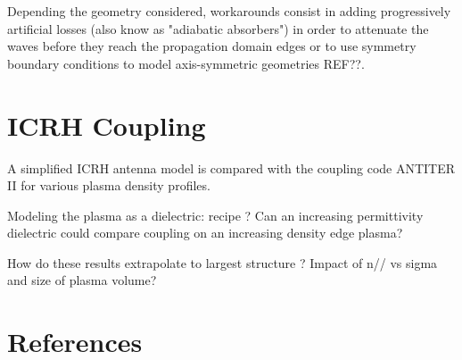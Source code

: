 \documentclass[preprint,3p,twocolumn]{elsarticle}
\begin{document}
Depending the geometry considered, workarounds consist in adding progressively artificial losses (also know as "adiabatic absorbers") in order to attenuate the waves before they reach the propagation domain edges\cite{Oskooi2008} or to use symmetry boundary conditions to model axis-symmetric geometries REF??.   



\section{ICRH Coupling}
A simplified ICRH antenna model is compared with the coupling code ANTITER II  \cite{Messiaen2011} for various plasma density profiles. 



Modeling the plasma as a dielectric: recipe ? Can an increasing permittivity dielectric could compare  coupling on an increasing density edge plasma? 


How do these results extrapolate to largest structure ? Impact of n// vs sigma and size of plasma volume? 




\section*{References}


\end{document}

